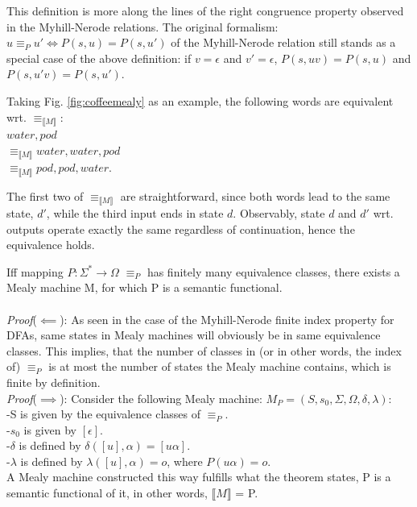 This definition is more along the lines of the right congruence property observed in the Myhill-Nerode relations. The original formalism: $u \equiv_P u' \iff P(s, u) = P(s, u')$ of the Myhill-Nerode relation still stands as a special case of the above definition: if $v=\epsilon$ and $v'=\epsilon$, $P(s, uv) = P(s, u)$ and $P(s, u'v) = P(s, u')$.

\begin{example}
	Taking Fig. \ref{fig:coffeemealy} as an example, the following words are equivalent wrt. $\equiv_{\llbracket M\rrbracket}$:\\
	\null\qquad\qquad\qquad\qquad\space $water, pod$\\
	\null\qquad\qquad$\equiv_{\llbracket M\rrbracket}$\qquad $water, water, pod$\\
	\null\qquad\qquad$\equiv_{\llbracket M\rrbracket}$\qquad $pod, pod, water$.
	
	The first two of $\equiv_{\llbracket M\rrbracket}$ are straightforward, since both words lead to the same state, $d'$, while the third input ends in state $d$. Observably, state $d$ and $d'$ wrt. outputs operate exactly the same regardless of continuation, hence the equivalence holds.
\end{example}

\begin{theorem}
	Iff mapping $P: \Sigma^*\to\Omega$ $\equiv_P$ has finitely many equivalence classes, there exists a Mealy machine M, for which P is a semantic functional.
	\\\\
	\textit{Proof}($\impliedby$): As seen in the case of the Myhill-Nerode finite index property for DFAs, same states in Mealy machines will obviously be in same equivalence classes. This implies, that the number of classes in (or in other words, the index of) $\equiv_P$ is at most the number of states the Mealy machine contains, which is finite by definition.
	\\
	\textit{Proof}($\implies$): Consider the following Mealy machine: $M_P=(S,s_{0},\Sigma,\Omega,\delta,\lambda)$:\\
	\null\qquad -S is given by the equivalence classes of $\equiv_P$.\\
	\null\qquad -$s_0$ is given by $[\epsilon]$.\\
	\null\qquad -$\delta$ is defined by $\delta([u], \alpha) = [u\alpha]$.\\
	\null\qquad -$\lambda$ is defined by $\lambda([u], \alpha) = o$, where $P(u\alpha) = o$.\\
	A Mealy machine constructed this way fulfills what the theorem states, P is a semantic functional of it, in other words, $\llbracket M\rrbracket$ = P.
\end{theorem}

